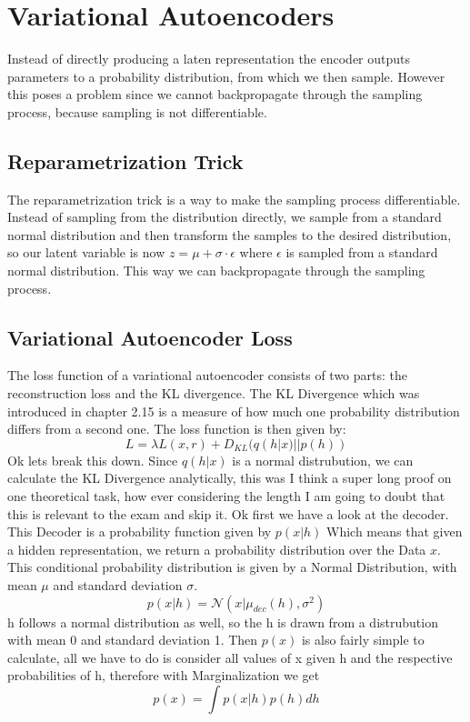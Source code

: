 \documentclass[a4paper]{article}
\begin{document}
\section{Variational Autoencoders}
Instead of directly producing a laten representation the encoder outputs parameters to a probability distribution, from which we then sample. However this poses a problem since we cannot backpropagate through the sampling process, because sampling is not differentiable. 
\subsection{Reparametrization Trick}
The reparametrization trick is a way to make the sampling process differentiable. Instead of sampling from the distribution directly, we sample from a standard normal distribution and then transform the samples to the desired distribution, so our latent variable is now $z = \mu + \sigma \cdot \epsilon$ where $\epsilon$ is sampled from a standard normal distribution. This way we can backpropagate through the sampling process.
\subsection{Variational Autoencoder Loss}
The loss function of a variational autoencoder consists of two parts: the reconstruction loss and the KL divergence. The KL Divergence which was introduced in chapter 2.15 is a measure of how much one probability distribution differs from a second one.  The loss function is then given by: \[
L = \lambda L(x, r) + D_{KL}(q(h|x) || p(h)) 
\]
Ok lets break this down. Since $q(h|x)$ is a normal distrubution, we can calculate the KL Divergence analytically, this was I think a super long proof on one theoretical task, how ever considering the length I am going to doubt that this is relevant to the exam and skip it. Ok first we have a look at the decoder. This Decoder is a probability function 
given by $p(x|h) $ Which means that given a hidden representation, we return a probability distribution over the Data $x$. This conditional probability distribution is given by a Normal Distribution, with mean $\mu$ and standard deviation $\sigma$. \[
p(x|h) = \mathcal{N}(x|\mu_{dec}(h), \sigma^2) \] h follows a normal distribution as well, so the h is drawn from a distrubution with mean 0 and standard deviation 1. Then $p(x)$ is also fairly simple to calculate, all we have to do is consider all values of x given h and the respective probabilities of h, therefore with Marginalization
we get \[
p(x) = \int p(x|h) p(h) dh \] 
\end{document}
